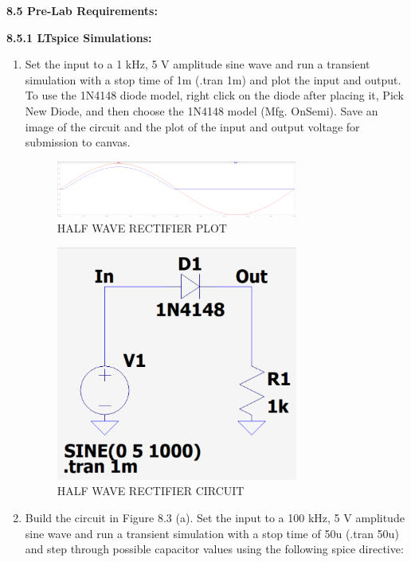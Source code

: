 \documentclass{article}
\begin{document}
\textbf{\large8.5 Pre-Lab Requirements:}

\textbf{8.5.1 LTspice Simulations:}
\begin{enumerate}
    \item Set the input to a 1 kHz, 5 V amplitude
sine wave and run a transient simulation with a stop time of 1m (.tran 1m)
and plot the input and output. To use the 1N4148 diode model, right click on
the diode after placing it, Pick New Diode, and then choose the 1N4148 model
(Mfg. OnSemi). Save an image of the circuit and the plot of the input and
output voltage for submission to canvas.
    \begin{figure}[H]
        \centering
        \includegraphics[width=0.75\textwidth]{fig8_2_a.png}
        \caption{HALF WAVE RECTIFIER PLOT} 
        \label{fig:half_wave_rectifier}
    \end{figure}
    \begin{figure}[H]
        \centering
        \includegraphics[width=0.75\textwidth]{circuit8_2_a.png}
        \caption{HALF WAVE RECTIFIER CIRCUIT} 
        \label{fig:half_wave_rectifier_circuit}
    \end{figure}
    \item Build the circuit in Figure 8.3 (a). Set the input to a 100 kHz, 5 V amplitude
sine wave and run a transient simulation with a stop time of 50u (.tran 50u)
and step through possible capacitor values using the following spice directive:

\end{enumerate}
\end{document}
